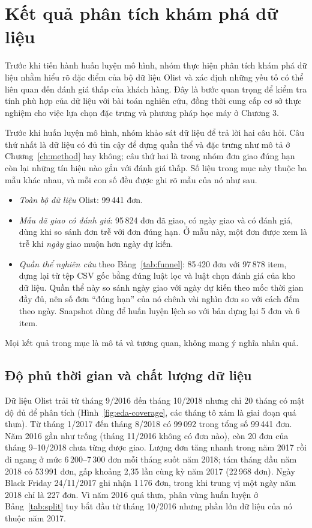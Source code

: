 \documentclass[12pt,a4paper]{report}
\begin{document}
\section{Kết quả phân tích khám phá dữ liệu}\label{sec:eda}

Trước khi tiến hành huấn luyện mô hình, nhóm thực hiện phân tích khám phá dữ liệu nhằm hiểu rõ đặc điểm của bộ dữ liệu Olist và xác định những yếu tố có thể liên quan đến đánh giá thấp của khách hàng. Đây là bước quan trọng để kiểm tra tính phù hợp của dữ liệu với bài toán nghiên cứu, đồng thời cung cấp cơ sở thực nghiệm cho việc lựa chọn đặc trưng và phương pháp học máy ở Chương 3.

Trước khi huấn luyện mô hình, nhóm khảo sát dữ liệu để trả lời hai câu hỏi. Câu thứ nhất là dữ liệu có đủ tin cậy để dựng quần thể và đặc trưng như mô tả ở Chương~\ref{ch:method} hay không; câu thứ hai là trong nhóm đơn giao đúng hạn còn lại những tín hiệu nào gắn với đánh giá thấp. Số liệu trong mục này thuộc ba mẫu khác nhau, và mỗi con số đều được ghi rõ mẫu của nó như sau.
\begin{itemize}
  \item \emph{Toàn bộ dữ liệu} Olist: 99\,441 đơn.
  \item \emph{Mẫu đã giao có đánh giá}: 95\,824 đơn đã giao, có ngày giao và có đánh giá, dùng khi so sánh đơn trễ với đơn đúng hạn. Ở mẫu này, một đơn được xem là trễ khi \emph{ngày} giao muộn hơn ngày dự kiến.
  \item \emph{Quần thể nghiên cứu} theo Bảng~\ref{tab:funnel}: 85\,420 đơn với 97\,878 item, dựng lại từ tệp CSV gốc bằng đúng luật lọc và luật chọn đánh giá của kho dữ liệu. Quần thể này so sánh ngày giao với ngày dự kiến theo mốc thời gian đầy đủ, nên số đơn ``đúng hạn'' của nó chênh vài nghìn đơn so với cách đếm theo ngày. Snapshot dùng để huấn luyện lệch so với bản dựng lại 5 đơn và 6 item.
\end{itemize}
Mọi kết quả trong mục là mô tả và tương quan, không mang ý nghĩa nhân quả.

\subsection{Độ phủ thời gian và chất lượng dữ liệu}\label{subsec:eda-coverage}

Dữ liệu Olist trải từ tháng 9/2016 đến tháng 10/2018 nhưng chỉ 20 tháng có mật độ đủ để phân tích (Hình~\ref{fig:eda-coverage}, các tháng tô xám là giai đoạn quá thưa). Từ tháng 1/2017 đến tháng 8/2018 có 99\,092 trong tổng số 99\,441 đơn. Năm 2016 gần như trống (tháng 11/2016 không có đơn nào), còn 20 đơn của tháng 9--10/2018 chưa từng được giao. Lượng đơn tăng nhanh trong năm 2017 rồi đi ngang ở mức 6\,200--7\,300 đơn mỗi tháng suốt năm 2018; tám tháng đầu năm 2018 có 53\,991 đơn, gấp khoảng 2,35 lần cùng kỳ năm 2017 (22\,968 đơn). Ngày Black Friday 24/11/2017 ghi nhận 1\,176 đơn, trong khi trung vị một ngày năm 2018 chỉ là 227 đơn. Vì năm 2016 quá thưa, phân vùng huấn luyện ở Bảng~\ref{tab:split} tuy bắt đầu từ tháng 10/2016 nhưng phần lớn dữ liệu của nó thuộc năm 2017.
\end{document}
